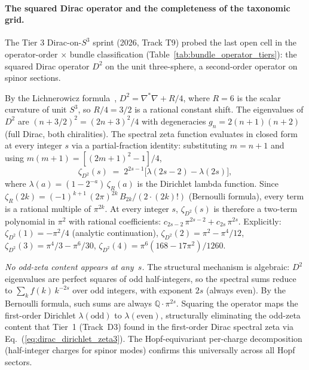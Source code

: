 
\paragraph{The squared Dirac operator and the completeness of the taxonomic grid.}
The Tier 3 Dirac-on-$S^3$ sprint (2026, Track T9) probed the last open
cell in the operator-order $\times$ bundle classification
(Table~\ref{tab:bundle_operator_tiers}): the squared Dirac operator
$D^2$ on the unit three-sphere, a second-order operator on spinor
sections.

By the Lichnerowicz formula~\cite{lichnerowicz1963}, $D^2 = \nabla^*\nabla + R/4$,
where $R = 6$ is the scalar curvature of unit $S^3$, so $R/4 = 3/2$ is a
rational constant shift.  The eigenvalues of $D^2$ are
$(n + 3/2)^2 = (2n+3)^2/4$ with degeneracies $g_n = 2(n+1)(n+2)$ (full
Dirac, both chiralities).  The spectral zeta function evaluates in closed
form at every integer $s$ via a partial-fraction identity: substituting
$m = n+1$ and using $m(m+1) = [(2m+1)^2 - 1]/4$,
\begin{equation}\label{eq:zeta_d2}
  \zeta_{D^2}(s)
  \;=\; 2^{2s-1}\bigl[\lambda(2s{-}2) - \lambda(2s)\bigr],
\end{equation}
where $\lambda(a) = (1 - 2^{-a})\,\zeta_R(a)$ is the Dirichlet lambda
function.  Since $\zeta_R(2k) = (-1)^{k+1}\,(2\pi)^{2k}\,B_{2k}/(2\cdot(2k)!)$
(Bernoulli formula), every term is a rational multiple of $\pi^{2k}$.
At every integer $s$, $\zeta_{D^2}(s)$ is therefore a two-term polynomial
in $\pi^2$ with rational coefficients:
$c_{2s-2}\,\pi^{2s-2} + c_{2s}\,\pi^{2s}$.  Explicitly:
$\zeta_{D^2}(1) = -\pi^2/4$ (analytic continuation),
$\zeta_{D^2}(2) = \pi^2 - \pi^4/12$,
$\zeta_{D^2}(3) = \pi^4/3 - \pi^6/30$,
$\zeta_{D^2}(4) = \pi^6(168 - 17\pi^2)/1260$.

\emph{No odd-zeta content appears at any~$s$.}  The structural mechanism
is algebraic: $D^2$ eigenvalues are perfect squares of odd half-integers,
so the spectral sums reduce to $\sum_k f(k)\,k^{-2s}$ over odd integers,
with exponent $2s$ (always even).  By the Bernoulli formula, such sums
are always $\mathbb{Q} \cdot \pi^{2s}$.  Squaring the operator maps the
first-order Dirichlet $\lambda(\text{odd})$ to $\lambda(\text{even})$,
structurally eliminating the odd-zeta content that Tier~1 (Track~D3)
found in the first-order Dirac spectral zeta via
Eq.~(\ref{eq:dirac_dirichlet_zeta3}).  The Hopf-equivariant per-charge
decomposition (half-integer charges for spinor modes) confirms this
universally across all Hopf sectors.

